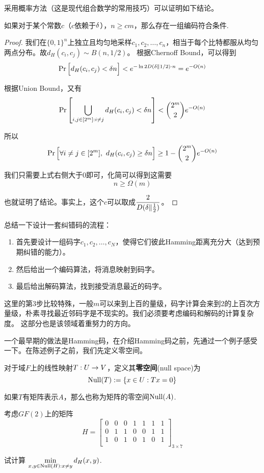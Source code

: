 采用概率方法（这是现代组合数学的常用技巧）可以证明如下结论。
\begin{theorem}
    如果对于某个常数$c$（$c$依赖于$\delta$），$n \ge cm$，那么存在一组编码符合条件.
\end{theorem}
\begin{proof}
    我们在$\{0,1\}^n$上独立且均匀地采样$c_1, c_2, \dots, c_n$，相当于每个比特都服从均匀两点分布。故$d_H(c_i,c_j) \sim B(n, 1/2)$。 根据Chernoff Bound，可以得到 
\[
\Pr \Big[
d_H(c_i, c_j) < \delta n  
\Big] < e^{- \ln 2  D(\delta \| 1/2) \cdot n} = e^{-O(n)}
\]

根据Union Bound，又有 
\[
\Pr \left[
    \bigcup_{i,j \in [2^m]: i\neq j} d_H(c_i, c_j) < \delta n
\right] < \binom{2^m}{2}e^{-O(n)}
\]

所以 
\[
\Pr \Big[
    \forall i\neq j \in [2^m],\ d_H(c_i,c_j) \ge \delta n
\Big] \ge 1 - \binom{2^m}{2}e^{-O(n)}
\]

我们只需要上式右侧大于0即可，化简可以得到这需要 
\[
n \ge \Omega(m)
\]

也就证明了结论。事实上，这个$c$可以取成$\dfrac{2}{D(\delta \| \frac 12)}$。
\end{proof}

总结一下设计一套纠错码的流程：
\begin{enumerate}
    \item 首先要设计一组码字$c_1,c_2,\dots, c_N$，使得它们彼此Hamming距离充分大（达到预期纠错的能力）。
    \item 然后给出一个编码算法，将消息映射到码字。
    \item 最后给出解码算法，找到接受消息最近的码字。
\end{enumerate}

这里的第3步比较特殊，一般$m$可以来到上百的量级，码字计算会来到2的上百次方量级，朴素寻找最近邻码字是不现实的。我们必须要考虑编码和解码的计算复杂度。 这部分也是该领域着重努力的方向。 

一个最早期的做法是Hamming码，在介绍Hamming码之前，先通过一个例子感受一下。在陈述例子之前，我们先定义零空间。
\begin{definition}
    对于域$F$上的线性映射$T: U \rightarrow V$，定义其\textbf{零空间}(null space)为
    \[
    \operatorname*{Null} (T):= \{x\in U: Tx = 0\}
    \]

    如果$T$有矩阵表示$A$，那么也称为矩阵的零空间$\operatorname*{Null} (A)$. 
\end{definition}
\begin{example}
    考虑$GF(2)$上的矩阵 
    \[
    H = \begin{bmatrix}
        0 & 0 & 0 & 1 & 1 & 1 & 1 \\ 
        0 & 1 & 1 & 0 & 0 & 1 & 1 \\ 
        1 & 0 & 1 & 0 & 1 & 0 & 1 \\ 
    \end{bmatrix}_{3 \times 7}
    \]

    试计算 $\min\limits_{x,y \in \operatorname*{Null}(H): x\neq y} d_H(x,y)$.
\end{example}

